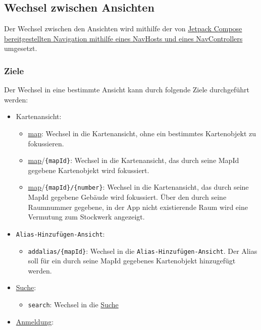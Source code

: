 \subsection{Wechsel zwischen Ansichten}\label{App_Navigation_Wechsel}
Der Wechsel zwischen den Ansichten wird mithilfe der von \href{https://developer.android.com/jetpack/compose/navigation?hl=fr}
{Jetpack Compose bereitgestellten Navigation mithilfe eines NavHosts und eines NavControllers} 
umgesetzt.

\subsubsection*{Ziele}\label{App_Navigation_Ziele}
Der Wechsel in eine bestimmte Ansicht kann durch folgende Ziele durchgeführt werden:
\begin{itemize}
    \item \Gls{Kartenansicht}: 
    \begin{itemize}
        \item \hyperref[App_Map]{map}: Wechsel in die \Gls{Kartenansicht}, ohne ein bestimmtes Kartenobjekt zu fokussieren.
        \item \hyperref[App_Map]{map}/\texttt{\{mapId\}}: Wechsel in die \Gls{Kartenansicht}, das durch seine MapId gegebene Kartenobjekt wird fokussiert.
        \item \hyperref[App_Map]{map}/\texttt{\{mapId\}/\{number\}}: Wechsel in die \Gls{Kartenansicht}, das durch seine MapId gegebene Gebäude wird fokussiert. 
        Über den durch seine Raumnummer gegebene, in der App nicht existierende Raum wird eine Vermutung zum Stockwerk angezeigt.
    \end{itemize}
    \item \texttt{Alias-Hinzufügen-Ansicht}:
    \begin{itemize}
        \item \texttt{addalias/\{mapId\}}: Wechsel in die \texttt{Alias-Hinzufügen-Ansicht}. 
        Der Alias soll für ein durch seine MapId gegebenes Kartenobjekt hinzugefügt werden.
    \end{itemize}
    \item \hyperref[App_Search]{Suche}: 
    \begin{itemize}
        \item \texttt{search}: Wechsel in die \hyperref[App_Search]{Suche}
    \end{itemize}
    \item \hyperref[App_SignUp]{Anmeldung}: \begin{itemize}

\end{itemize}
\end{itemize}
